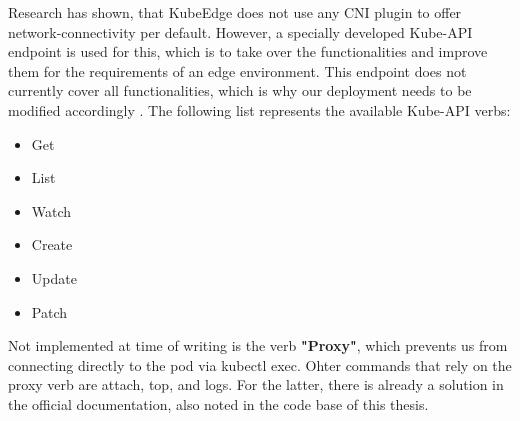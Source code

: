 \documentclass[MSC,Master,english]{twbook}%
\begin{document}
Research has shown, that KubeEdge does not use any CNI plugin to offer network-connectivity per default. However, a specially developed Kube-API endpoint is used for this, which is to take over the functionalities and improve them for the requirements of an edge environment. This endpoint does not currently cover all functionalities, which is why our deployment needs to be modified accordingly \cite{ke-ake-gh}.
\vspace{\baselineskip}
The following list represents the available Kube-API verbs:
\begin{itemize}
    \itemsep0em 
    \item Get
    \item List
    \item Watch
    \item Create
    \item Update
    \item Patch
\end{itemize}

Not implemented at time of writing is the verb \textbf{"Proxy"}, which prevents us from connecting directly to the pod via kubectl exec. Ohter commands that rely on the proxy verb are attach, top, and logs. For the latter, there is already a solution in the official documentation, also noted in the code base of this thesis.\medbreak
\end{document}
